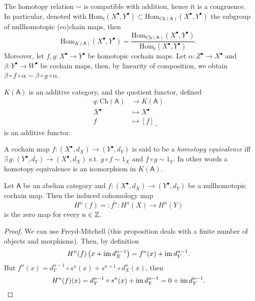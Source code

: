 \begin{rem}[]
	The homotopy relation $\sim$ is compatible with addition, hence it is a congruence.
	In particular, denoted with
	$\mathrm{Hom}_{t}\left( X^\bullet, Y^\bullet \right) \subset
	\mathrm{Hom}_{\mathrm{Ch}(\mathsf{A})}\left( X^\bullet, Y^\bullet \right)$ the subgroup of
	nullhomotopic (co)chain maps, then
	\begin{equation}
		\mathrm{Hom}_{K(\mathsf{A})}\left( X^\bullet, Y^\bullet \right) =
		\frac{\mathrm{Hom}_{\mathrm{Ch}(\mathsf{A})}\left( X^\bullet, Y^\bullet \right)}{
		\mathrm{Hom}_{t}\left( X^\bullet, Y^\bullet \right)}
	.\end{equation} 
	Moreover, let $f,g\colon X^\bullet \to Y^\bullet$ be homotopic cochain maps.
	Let $\alpha\colon Z^\bullet \to X^\bullet$ and $\beta\colon Y^\bullet \to W^\bullet$ be cochain maps,
	then, by linearity of composition, we obtain
	$\beta \circ f \circ \alpha \sim \beta \circ g \circ \alpha$.
\end{rem}

\begin{prop}
	$K(\mathsf{A})$ is an additive category, and the quotient functor,
	defined
	\begin{align}
		q\colon \mathrm{Ch}(\mathsf{A}) &\to K(\mathsf{A}) \\
		X^\bullet &\mapsto X^\bullet\\
		f &\mapsto [f]_{\sim}
	\end{align} 
	is an additive functor.
\end{prop} 

\begin{defn}
	A cochain map $f\colon \left( X^{\bullet}, d_{X} \right) \to \left( Y^{\bullet}, d_{Y} \right)$
	is said to be a {\em homotopy equivalence} iff
	$\exists\, g\colon \left( Y^{\bullet}, d_{Y} \right) \to \left( X^{\bullet}, d_{X} \right)$
	s.t.
	$g \circ f \sim 1_X$ and $f \circ g \sim 1_Y$.
	In other words a homotopy equivalence is an isomorphism in $K(\mathsf{A})$.
\end{defn}

\begin{prop}
	Let $\mathsf{A}$ be an abelian category and
	$f\colon \left( X^{\bullet}, d_{X} \right) \to \left( Y^{\bullet}, d_{Y} \right)$ be a
	nullhomotopic cochain map.
	Then the induced cohomology map
	\begin{equation}
		H^n(f) =: \overline{f^n}\colon H^n(X) \to H^n(Y)
	\end{equation} 
	is the zero map for every $n \in \mathbb{Z}$.
\end{prop} 
\begin{proof}
	We can use Freyd-Mitchell
	(this proposition deals with a finite number of objects and morphisms).
	Then, by definition
	\begin{equation}
		H^n(f) \left( x + \operatorname{im} d_X^{n-1} \right) = f^n(x) + \operatorname{im} d_Y^{n-1}
	.\end{equation} 
	But $f^n(x) = d^{n-1}_Y \circ s^n(x) + s^{n+1} \circ d_X^{n}(x)$,
	then
	\begin{equation*}
		H^n(f)(x) = d^{n-1}_Y \circ s^n (x) + \operatorname{im} d_Y^{n-1} = 0 + \operatorname{im} d_Y^{n-1}.\qedhere
	\end{equation*} 
\end{proof}

